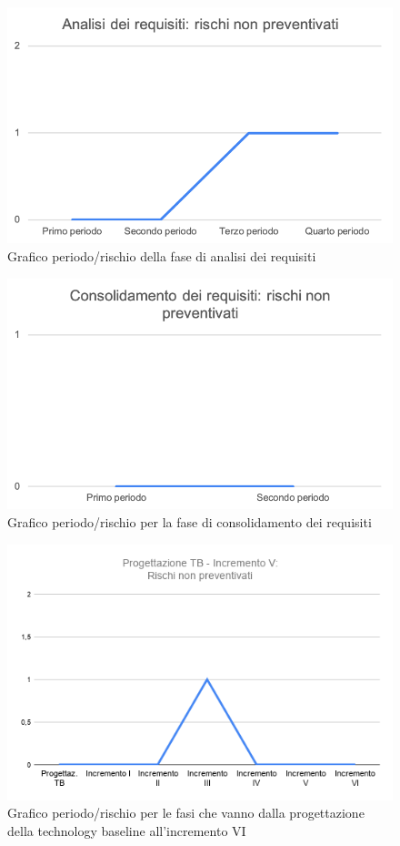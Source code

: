 	\begin{figure}[H]
		\centering
		\includegraphics[width=0.8\linewidth]{./res/images/RischiNonPrevent_1.png}
		\caption{Grafico periodo/rischio della fase di analisi dei requisiti}
		\label{fig:Grafico periodo/rischio nel periodo di analisi dei requisiti}
	\end{figure}

	\begin{figure}[H]
			\centering
			\includegraphics[width=0.8\linewidth]{./res/images/RischiNonPrevent_2.png}
			\caption{Grafico periodo/rischio per la fase di consolidamento dei requisiti}
			\label{fig:Grafico periodo/rischio per la fase di consolidamento dei requisiti}
	\end{figure}

	\begin{figure}[H]
			\centering
			\includegraphics[width=0.8\linewidth]{./res/images/RischiNonPrevent_3.png}
			\caption{Grafico periodo/rischio per le fasi che vanno dalla progettazione della technology baseline all'incremento VI}
			\label{fig:Grafico periodo/rischio per le fasi che vanno dalla progettazione della technology baseline all'incremento VI}
	\end{figure}

